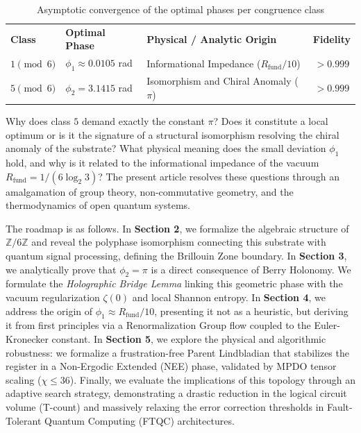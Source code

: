 \documentclass[reprint,aps,pra,superscriptaddress,nofootinbib]{revtex4-2}
\theoremstyle{plain}
\theoremstyle{definition}
\theoremstyle{remark}
\begin{document}
\begin{table}[htbp]
\centering
\caption{Asymptotic convergence of the optimal phases per congruence class}
\label{tab:fases}
\begin{ruledtabular}
\begin{tabular}{lllc}
\textbf{Class} & \textbf{Optimal Phase} & \textbf{Physical / Analytic Origin} & \textbf{Fidelity} \\
\colrule
$1 \pmod 6$ & $\phi_1 \approx 0.0105$ rad & Informational Impedance ($R_{\text{fund}}/10$) & $> 0.999$ \\
$5 \pmod 6$ & $\phi_2 = 3.1415$ rad & Isomorphism and Chiral Anomaly ($\pi$) & $> 0.999$ \\
\end{tabular}
\end{ruledtabular}
\end{table}

Why does class $5$ demand exactly the constant $\pi$? Does it constitute a local optimum or is it the signature of a structural isomorphism resolving the chiral anomaly of the substrate? What physical meaning does the small deviation $\phi_1$ hold, and why is it related to the informational impedance of the vacuum $R_{\text{fund}} = 1/(6\log_2 3)$? The present article resolves these questions through an amalgamation of group theory, non-commutative geometry, and the thermodynamics of open quantum systems.

The roadmap is as follows. In \textbf{Section 2}, we formalize the algebraic structure of $\mathbb{Z}/6\mathbb{Z}$ and reveal the polyphase isomorphism connecting this substrate with quantum signal processing, defining the Brillouin Zone boundary. In \textbf{Section 3}, we analytically prove that $\phi_2 = \pi$ is a direct consequence of Berry Holonomy. We formulate the \textit{Holographic Bridge Lemma} linking this geometric phase with the vacuum regularization $\zeta(0)$ and local Shannon entropy. In \textbf{Section 4}, we address the origin of $\phi_1 \approx R_{\text{fund}}/10$, presenting it not as a heuristic, but deriving it from first principles via a Renormalization Group flow coupled to the Euler-Kronecker constant. In \textbf{Section 5}, we explore the physical and algorithmic robustness: we formalize a frustration-free Parent Lindbladian that stabilizes the register in a Non-Ergodic Extended (NEE) phase, validated by MPDO tensor scaling ($\chi \le 36$). Finally, we evaluate the implications of this topology through an adaptive search strategy, demonstrating a drastic reduction in the logical circuit volume (T-count) and massively relaxing the error correction thresholds in Fault-Tolerant Quantum Computing (FTQC) architectures.
\end{document}
